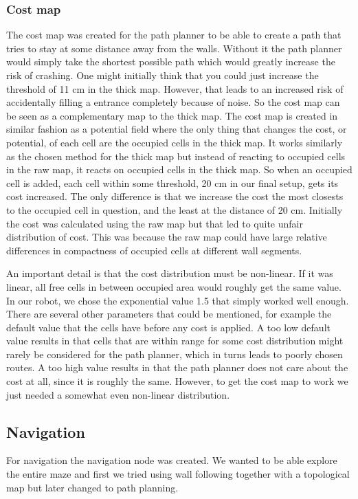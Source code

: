 \subsubsection{Cost map}
The cost map was created for the path planner to be able to create a path that tries to stay at some distance away from the walls. Without it the path planner would simply take the shortest possible path which would greatly increase the risk of crashing. One might initially think that you could just increase the threshold of 11 cm in the thick map. However, that leads to an increased risk of accidentally filling a entrance completely because of noise. So the cost map can be seen as a complementary map to the thick map. The cost map is created in similar fashion as a potential field where the only thing that changes the cost, or potential, of each cell are the occupied cells in the thick map. It works similarly as the chosen method for the thick map but instead of reacting to occupied cells in the raw map, it reacts on occupied cells in the thick map. So when an occupied cell is added, each cell within some threshold, 20 cm in our final setup, gets its cost increased. The only difference is that we increase the cost the most closests to the occupied cell in question, and the least at the distance of 20 cm. Initially the cost was calculated using the raw map but that led to quite unfair distribution of cost. This was because the raw map could have large relative differences in compactness of occupied cells at different wall segments. 

An important detail is that the cost distribution must be non-linear. If it was linear, all free cells in between occupied area would roughly get the same value. In our robot, we chose the exponential value 1.5 that simply worked well enough. There are several other parameters that could be mentioned, for example the default value that the cells have before any cost is applied. A too low default value results in that cells that are within range for some cost distribution might rarely be considered for the path planner, which in turns leads to poorly chosen routes. A too high value results in that the path planner does not care about the cost at all, since it is roughly the same. However, to get the cost map to work we just needed a somewhat even non-linear distribution. 


\subsection{Navigation}
For navigation the navigation node was created. We wanted to be able explore the entire maze and first we tried using wall following together with a topological map but later changed to path planning. 

